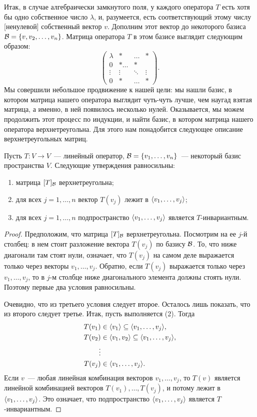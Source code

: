Итак, в случае алгебраически замкнутого поля, у каждого оператора
$T$ есть хотя бы одно собственное число $\lambda$, и, разумеется,
есть соответствующий этому числу [ненулевой] собственный вектор $v$.
Дополним этот вектор до некоторого базиса
$\mathcal B = \{v, v_2,\dots,v_n\}$.
Матрица оператора $T$ в этом базисе выглядит следующим образом:
$$
\begin{pmatrix}
\lambda & * & \dots & * \\
0 & * \dots & * \\
\vdots & \vdots & \ddots & \vdots \\
0 & * & \dots & *
\end{pmatrix}.
$$
Мы совершили небольшое продвижение к нашей цели: мы нашли базис,
в котором матрица нашего оператора выглядит чуть-чуть лучше, чем наугад
взятая матрица, а именно, в ней появилось несколько нулей.
Оказывается, мы можем продолжить этот процесс по индукции, и
найти базис, в котором матрица нашего оператора верхнетреугольна.
Для этого нам понадобится следующее описание верхнетреугольных матриц.
\begin{proposition}\label{prop:ut-equivalent-defs}
Пусть $T\colon V\to V$~--- линейный оператор,
$\mathcal B = \{v_1,\dots,v_n\}$~--- некоторый базис пространства $V$.
Следующие утверждения равносильны:
\begin{enumerate}
\item матрица $[T]_{\mathcal B}$ верхнетреугольна;
\item для всех $j=1,\dots,n$ вектор $T(v_j)$ лежит в
$\langle v_1,\dots,v_j\rangle$;
\item для всех $j=1,\dots,n$ подпространство
$\langle v_1,\dots,v_j\rangle$ является $T$-инвариантным.
\end{enumerate}
\end{proposition}
\begin{proof}
Предположим, что матрица $[T]_{\mathcal B}$ верхнетреугольна. Посмотрим
на ее $j$-й столбец: в нем стоит разложение вектора $T(v_j)$
по базису $\mathcal B$. То, что ниже диагонали там стоят нули, означает,
что $T(v_j)$ на самом деле выражается только через векторы
$v_1,\dots,v_j$. Обратно, если $T(v_j)$ выражается только через
$v_1,\dots,v_j$, то в $j$-м столбце ниже диагонального элемента
должны стоять нули. Поэтому первые два условия равносильны.

Очевидно, что из третьего условия следует второе. Осталось лишь
показать, что из второго следует третье. Итак, пусть выполняется
(2). Тогда
\begin{align*}
T(v_1)&\in\langle v_1\rangle \subseteq\langle v_1,\dots,v_j\rangle,\\
T(v_2)&\in\langle v_1,v_2\rangle \subseteq\langle v_1,\dots,v_j\rangle,\\
\vdots& \\
T(v_j)&\in\langle v_1,\dots,v_j\rangle.
\end{align*}
Если $v$~--- любая линейная комбинация векторов $v_1,\dots,v_j$,
то $T(v)$ является линейной комбинацией векторов $T(v_1),\dots,T(v_j)$,
и потому лежит в $\langle v_1,\dots,v_j\rangle$. Это означает, что
подпространство $\langle v_1,\dots,v_j\rangle$ является $T$-инвариантным.
\end{proof}

